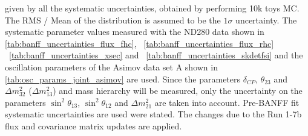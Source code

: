 \begin{table}[htb]
{ given by all the systematic uncertainties, obtained by performing 10k toys MC.
The RMS / Mean of the distribution is assumed to be the $1\sigma$ uncertainty.
The systematic parameter values measured with the ND280 data 
shown in 
\cref{tab:banff_uncertainties_flux_fhc},
~\ref{tab:banff_uncertainties_flux_rhc}
~\ref{tab:banff_uncertainties_xsec}
and
~\ref{tab:banff_uncertainties_skdetfsi}
and the oscillation parameters of the Asimov data set A shown in \cref{tab:osc_params_joint_asimov}
are used.
Since the parameters $\delta_{CP}$, $\theta_{23}$ and $\Delta m^2_{32}$ ($\Delta m^2_{13}$) and mass hierarchy
will be measured,
only the uncertainty on the parameters 
$\sin^2 \theta_{13}$,
$\sin^2 \theta_{12}$
and 
$\Delta m^2_{21}$ 
are taken into account.
Pre-BANFF fit systematic uncertainties are used were stated.
The changes due to the Run 1-7b flux and covariance matrix updates are applied.
}                                                                                                                                                                                          
\label{tab:nsk_systematic_table_summary_joint_asimov_A_rhc_mulike_Run17b}
\end{table}





